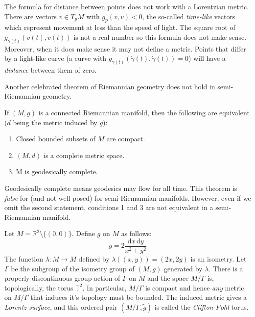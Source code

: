 \documentclass{beamer}
\begin{document}
    \begin{frame}
        The formula for distance between points does not work with a Lorentzian
        metric. There are vectors $v\in{T}_{p}M$ with
        $g_{p}(v,v)<0$, the so-called \textit{time-like} vectors which
        represent movement at less than the speed of light. The square root of
        $g_{\gamma(t)}(\dot{v}(t),\dot{v}(t))$ is not a real number so this
        formula does not make sense. Moreover, when it does make sense it may
        not define a metric. Points that differ by a light-like curve (a curve
        with $g_{\gamma(t)}(\dot{\gamma}(t),\dot{\gamma}(t))=0$) will have a
        \textit{distance} between them of zero.
    \end{frame}
    \begin{frame}
        Another celebrated theorem of Riemannian geometry does not hold in
        semi-Riemannian geometry.
        \begin{theorem}
            If $(M,g)$ is a connected Riemannian manifold, then the following
            are equivalent ($d$ being the metric induced by $g$):
            \begin{enumerate}
                \item Closed bounded subsets of $M$ are compact.
                \item $(M,d)$ is a complete metric space.
                \item M is geodesically complete.
            \end{enumerate}
        \end{theorem}
        Geodesically complete means geodesics may flow for all time. This
        theorem is \textit{false} for (and not well-posed) for semi-Riemannian
        manifolds. However, even if we omit the second statement, conditions
        1 and 3 are not equivalent in a semi-Riemannian manifold.
    \end{frame}
    \begin{frame}
        Let $M=\mathbb{R}^{2}\setminus\{(0,0)\}$. Define $g$ on $M$ as follows:
        \begin{equation}
            g=2\frac{\textrm{d}x\,\textrm{d}y}{x^{2}+y^{2}}
        \end{equation}
        The function $\lambda:M\rightarrow{M}$ defined by
        $\lambda((x,y))=(2x,2y)$ is an isometry. Let $\Gamma$ be the subgroup
        of the isometry group of $(M,g)$ generated by $\lambda$. There is a
        properly discontinuous group action of $\Gamma$ on $M$ and the space
        $M/\Gamma$ is, topologically, the torus $\mathbb{T}^{2}$. In particular,
        $M/\Gamma$ is compact and hence \textit{any} metric on $M/\Gamma$ that
        induces it's topology must be bounded. The induced metric gives a
        \textit{Lorentz surface}, and this ordered pair
        $(M/\Gamma,\tilde{g})$ is called the
        \textit{Clifton-Pohl} torus.
    \end{frame}
\end{document}
